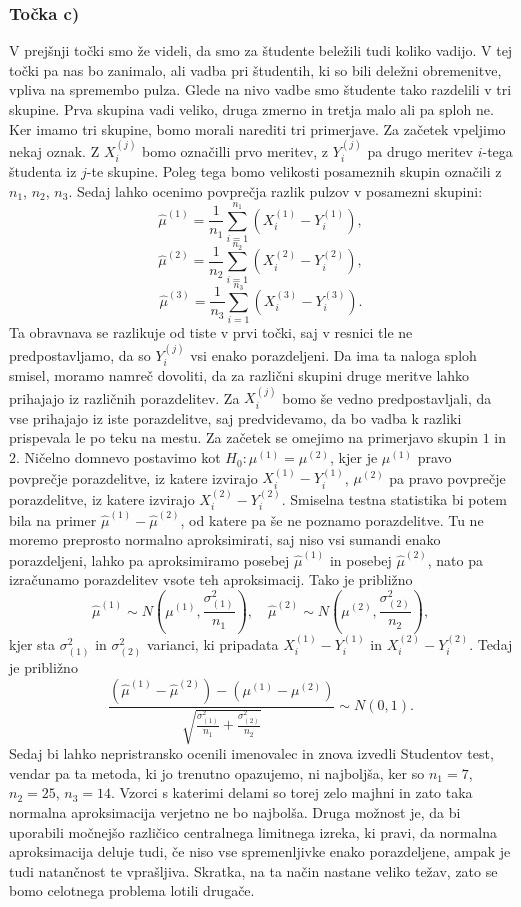 \documentclass[12pt, letterpaper]{article}
\begin{document}
\subsubsection*{Točka c)} V prejšnji točki smo že videli, da smo za študente beležili tudi koliko vadijo. V tej točki pa nas bo zanimalo, ali vadba pri študentih, ki so bili deležni obremenitve, vpliva na spremembo pulza. Glede na nivo vadbe smo študente tako razdelili v tri skupine. Prva skupina vadi veliko, druga zmerno in tretja malo ali pa sploh ne. Ker imamo tri skupine, bomo morali narediti tri primerjave. Za začetek vpeljimo nekaj oznak. Z $X_i^{(j)}$ bomo označilli prvo meritev, z $Y_i^{(j)}$ pa drugo meritev $i$-tega študenta iz $j$-te skupine. Poleg tega bomo velikosti posameznih skupin označili z $n_1$, $n_2$, $n_3$. Sedaj lahko ocenimo povprečja razlik pulzov v posamezni skupini:
\[
\hat{\mu}^{(1)} = \frac{1}{n_1}\sum_{i=1}^{n_1} \left(X_i^{(1)} - Y_i^{(1)}\right),
\]
\[
\hat{\mu}^{(2)} = \frac{1}{n_2}\sum_{i=1}^{n_2} \left(X_i^{(2)} - Y_i^{(2)}\right),
\]
\[ 
\hat{\mu}^{(3)} = \frac{1}{n_3}\sum_{i=1}^{n_3} \left(X_i^{(3)} - Y_i^{(3)}\right).
\]
Ta obravnava se razlikuje od tiste v prvi točki, saj v resnici tle ne predpostavljamo, da so $Y_i^{(j)}$ vsi enako porazdeljeni. Da ima ta naloga sploh smisel, moramo namreč dovoliti, da za različni skupini druge meritve lahko prihajajo iz različnih porazdelitev. Za $X_i^{(j)}$ bomo še vedno predpostavljali, da vse prihajajo iz iste porazdelitve, saj predvidevamo, da bo vadba k razliki prispevala le po teku na mestu. Za začetek se omejimo na primerjavo skupin $1$ in $2$. Ničelno domnevo postavimo kot $H_0 : \mu^{(1)} = \mu^{(2)}$, kjer je $\mu^{(1)}$ pravo povprečje porazdelitve, iz katere izvirajo $X_i^{(1)} - Y_i^{(1)}$, $\mu^{(2)}$ pa pravo povprečje porazdelitve, iz katere izvirajo $X_i^{(2)} - Y_i^{(2)}$. Smiselna testna statistika bi potem bila na primer $\hat{\mu}^{(1)} - \hat{\mu}^{(2)}$, od katere pa še ne poznamo porazdelitve. Tu ne moremo preprosto normalno aproksimirati, saj niso vsi sumandi enako porazdeljeni, lahko pa aproksimiramo posebej $\hat{\mu}^{(1)}$ in posebej $\hat{\mu}^{(2)}$, nato pa izračunamo porazdelitev vsote teh aproksimacij. Tako je približno
\[
\hat{\mu}^{(1)} \sim N\left(\mu^{(1)}, \frac{\sigma_{(1)}^2}{n_1}\right), \quad \hat{\mu}^{(2)} \sim N\left(\mu^{(2)}, \frac{\sigma_{(2)}^2}{n_2}\right),
\]
kjer sta $\sigma_{(1)}^2$ in $\sigma_{(2)}^2$ varianci, ki pripadata $X_i^{(1)} - Y_i^{(1)}$ in $X_i^{(2)} - Y_i^{(2)}$. Tedaj je približno
\[
\frac{(\hat{\mu}^{(1)} - \hat{\mu}^{(2)}) - (\mu^{(1)} - \mu^{(2)})}{\sqrt{\frac{\sigma_{(1)}^2}{n_1} + \frac{\sigma_{(2)}^2}{n_2}}} \sim N(0,1).
\]
Sedaj bi lahko nepristransko ocenili imenovalec in znova izvedli Studentov test, vendar pa ta metoda, ki jo trenutno opazujemo, ni najboljša, ker so $n_1 = 7$, $n_2 = 25$, $n_3 = 14$. Vzorci s katerimi delami so torej zelo majhni in zato taka normalna aproksimacija verjetno ne bo najbolša. Druga možnost je, da bi uporabili močnejšo različico centralnega limitnega izreka, ki pravi, da normalna aproksimacija deluje tudi, če niso vse spremenljivke enako porazdeljene, ampak je tudi natančnost te vprašljiva. Skratka, na ta način nastane veliko težav, zato se bomo celotnega problema lotili drugače.
\end{document}
